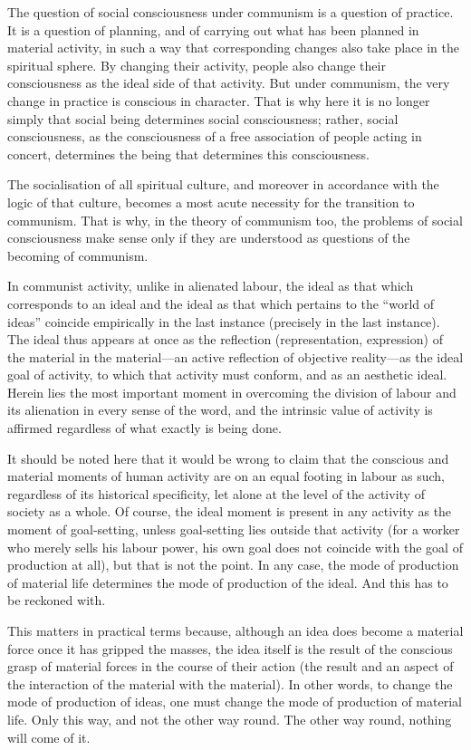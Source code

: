 \documentclass[../main]{subfiles}
\begin{document}
The question of social consciousness under communism is a question of practice. It is a question of planning, and of carrying out what has been planned in material activity, in such a way that corresponding changes also take place in the spiritual sphere. By changing their activity, people also change their consciousness as the ideal side of that activity. But under communism, the very change in practice is conscious in character. That is why here it is no longer simply that social being determines social consciousness; rather, social consciousness, as the consciousness of a free association of people acting in concert, determines the being that determines this consciousness.

The socialisation of all spiritual culture, and moreover in accordance with the logic of that culture, becomes a most acute necessity for the transition to communism. That is why, in the theory of communism too, the problems of social consciousness make sense only if they are understood as questions of the becoming of communism.

In communist activity, unlike in alienated labour, the ideal as that which corresponds to an ideal and the ideal as that which pertains to the “world of ideas” coincide empirically in the last instance (precisely in the last instance). The ideal thus appears at once as the reflection (representation, expression) of the material in the material—an active reflection of objective reality—as the ideal goal of activity, to which that activity must conform, and as an aesthetic ideal. Herein lies the most important moment in overcoming the division of labour and its alienation in every sense of the word, and the intrinsic value of activity is affirmed regardless of what exactly is being done.

It should be noted here that it would be wrong to claim that the conscious and material moments of human activity are on an equal footing in labour as such, regardless of its historical specificity, let alone at the level of the activity of society as a whole. Of course, the ideal moment is present in any activity as the moment of goal-setting, unless goal-setting lies outside that activity (for a worker who merely sells his labour power, his own goal does not coincide with the goal of production at all), but that is not the point. In any case, the mode of production of material life determines the mode of production of the ideal. And this has to be reckoned with.

This matters in practical terms because, although an idea does become a material force once it has gripped the masses, the idea itself is the result of the conscious grasp of material forces in the course of their action (the result and an aspect of the interaction of the material with the material). In other words, to change the mode of production of ideas, one must change the mode of production of material life. Only this way, and not the other way round. The other way round, nothing will come of it.
\end{document}
